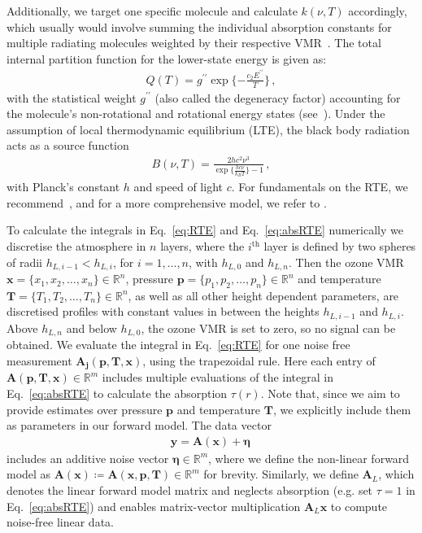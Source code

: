 Additionally, we target one specific molecule and calculate $k(\nu, T)$ accordingly, which usually would involve summing the individual absorption constants for multiple radiating molecules weighted by their respective VMR~\cite{mipas2000handbook}.
The total internal partition function for the lower-state energy is given as:
\begin{align}
	Q(T )= g^{\prime \prime} \exp{\{ - \frac{ c_2 E^{\prime \prime} }{T}\}} \, ,
\end{align}
with the statistical weight $ g^{\prime \prime}$ (also called the degeneracy factor) accounting for the molecule's non-rotational and rotational energy states (see~\cite{vsimevckova2006einstein}).
Under the assumption of local thermodynamic equilibrium (LTE), the black body radiation acts as a source function
\begin{align}
	B(\nu,T)   = \frac{2 h c^2 \nu^3}{\exp{\{\frac{hc\nu}{k_B T}\}}-1}\, ,
\end{align}
with Planck's constant $h$ and speed of light $c$.
For fundamentals on the RTE, we recommend~\cite[Chapter 1]{rybicki2000rte}, and for a more comprehensive model, we refer to \cite{read2006forwardModel}.

To calculate the integrals in Eq.~\ref{eq:RTE} and Eq.~\ref{eq:absRTE} numerically we discretise the atmosphere in $n$ layers, where the $i^\text{th}$ layer is defined by two spheres of radii $h_{L,i-1} < h_{L,i}$, for $i = 1, \dots, n$, with $h_{L,0}$ and $h_{L,n} $.
Then the ozone VMR $\bm{x} =\{x_1,x_2,\ldots,x_n\} \in \mathbb{R}^{n}$, pressure $\bm{p} =\{p_1,p_2,\ldots,p_n\} \in \mathbb{R}^{n}$ and temperature $\bm{T} =\{T_1,T_2,\ldots,T_n\} \in \mathbb{R}^{n}$, as well as all other height dependent parameters, are discretised profiles with constant values in between the heights $h_{L,i-1}$ and $h_{L,i}$.
Above $h_{L, n}$ and below $h_{L,0} $, the ozone VMR is set to zero, so no signal can be obtained.
We evaluate the integral in Eq.~\eqref{eq:RTE} for one noise free measurement $\bm{A_{j}}(\bm{p},\bm{T},\bm{x})$, using the trapezoidal rule.
Here each entry of $\bm{A}(\bm{p},\bm{T},\bm{x})\in \mathbb{R}^{m}$ includes multiple evaluations of the integral in Eq.~\ref{eq:absRTE} to calculate the absorption $\tau(r)$.
Note that, since we aim to provide estimates over pressure $\bm{p}$ and temperature $\bm{T}$, we explicitly include them as parameters in our forward model.
The data vector
\begin{align}
	\bm{y} = \bm{A}(\bm{x}) + \bm{\eta}\, 
\end{align}
includes an additive noise vector $\bm{\eta} \in \mathbb{R}^{m}$, where we define the non-linear forward model as $\bm{A}(\bm{x}) \coloneqq \bm{A}(\bm{x},  \bm{p},\bm{T})   \in \mathbb{R}^{m}$ for brevity.
Similarly, we define $\bm{A}_L$, which denotes the linear forward model matrix and neglects absorption (e.g. set $\tau = 1$ in Eq.~\eqref{eq:absRTE}) and enables matrix-vector multiplication $\bm{A}_L \bm{x}$ to compute noise-free linear data.

